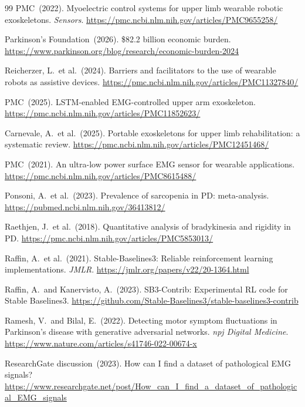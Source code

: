\documentclass{article}
\begin{document}
\begin{thebibliography}{99}
PMC\ (2022).
Myoelectric control systems for upper limb wearable robotic exoskeletons.
\textit{Sensors}.
\url{https://pmc.ncbi.nlm.nih.gov/articles/PMC9655258/}

Parkinson's Foundation\ (2026).
\$82.2 billion economic burden.
\url{https://www.parkinson.org/blog/research/economic-burden-2024}

Reicherzer, L.\ et al.\ (2024).
Barriers and facilitators to the use of wearable robots as assistive
devices.
\url{https://pmc.ncbi.nlm.nih.gov/articles/PMC11327840/}

PMC\ (2025).
LSTM-enabled EMG-controlled upper arm exoskeleton.
\url{https://pmc.ncbi.nlm.nih.gov/articles/PMC11852623/}

Carnevale, A.\ et al.\ (2025).
Portable exoskeletons for upper limb rehabilitation: a systematic review.
\url{https://pmc.ncbi.nlm.nih.gov/articles/PMC12451468/}

PMC\ (2021).
An ultra-low power surface EMG sensor for wearable applications.
\url{https://pmc.ncbi.nlm.nih.gov/articles/PMC8615488/}

Ponsoni, A.\ et al.\ (2023).
Prevalence of sarcopenia in PD: meta-analysis.
\url{https://pubmed.ncbi.nlm.nih.gov/36413812/}

Raethjen, J.\ et al.\ (2018).
Quantitative analysis of bradykinesia and rigidity in PD.
\url{https://pmc.ncbi.nlm.nih.gov/articles/PMC5853013/}

Raffin, A.\ et al.\ (2021).
Stable-Baselines3: Reliable reinforcement learning implementations.
\textit{JMLR}.
\url{https://jmlr.org/papers/v22/20-1364.html}

Raffin, A.\ and Kanervisto, A.\ (2023).
SB3-Contrib: Experimental RL code for Stable Baselines3.
\url{https://github.com/Stable-Baselines3/stable-baselines3-contrib}

Ramesh, V.\ and Bilal, E.\ (2022).
Detecting motor symptom fluctuations in Parkinson's disease with
generative adversarial networks.
\textit{npj Digital Medicine}.
\url{https://www.nature.com/articles/s41746-022-00674-x}

ResearchGate discussion\ (2023).
How can I find a dataset of pathological EMG signals?
\url{https://www.researchgate.net/post/How_can_I_find_a_dataset_of_pathological_EMG_signals}


\end{thebibliography}
\end{document}
